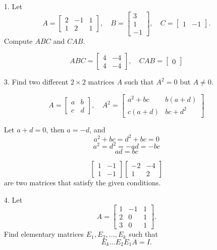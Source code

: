 \documentclass{article}
\begin{document}
\begin{enumerate}[listparindent=\parindent]
\item[1.] Let
    \[
        A = \begin{bmatrix}
            2 & -1 & 1 \\
            1 & 2 & 1
        \end{bmatrix}, \quad
        B = \begin{bmatrix}
            3 \\ 1 \\ -1
        \end{bmatrix}, \quad
        C = \begin{bmatrix}
            1 & -1
        \end{bmatrix}.
    \]
    Compute \(ABC\) and \(CAB\).

    \[
        ABC = \begin{bmatrix}
            4 & -4 \\
            4 & -4
        \end{bmatrix}
        , \quad
        CAB = \begin{bmatrix}
            0
        \end{bmatrix}
    \]

\item[3.] Find two different \(2 \times 2\) matrices \(A\) such that \(A^2 = 0\) but \(A \neq 0\).

\[
    A = \begin{bmatrix}
        a & b \\
        c & d
    \end{bmatrix}, \quad
    A^2 = \begin{bmatrix}
        a^2 + bc & b(a + d) \\
        c(a + d) & bc + d^2
    \end{bmatrix}
\]

Let \(a + d = 0\), then \(a = -d\), and
\[a^2 + bc = d^2 + bc = 0\]
\[a^2 = d^2 = -ad = -bc\]
\[ad = bc\]

\[
    \begin{bmatrix}
        1 & -1 \\
        1 & -1
    \end{bmatrix}
    \begin{bmatrix}
        -2 & -4 \\
        1 & 2
    \end{bmatrix}
\]
are two matrices that satisfy the given conditions.

\item[4.] Let
    \[
        A = \begin{bmatrix}
            1 & -1 & 1 \\
            2 & 0 & 1 \\
            3 & 0 & 1
        \end{bmatrix}.
    \] Find elementary matrices \(E_1, E_2, \dots, E_k\) such that
    \[E_k \dots E_2E_1A = I.\]


\end{enumerate}
\end{document}
